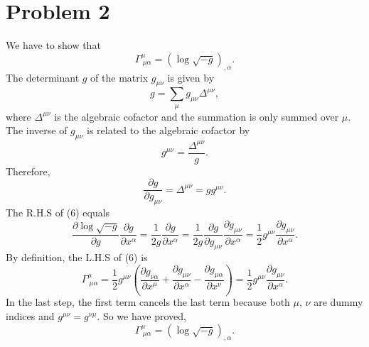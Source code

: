 \documentclass{article}
\begin{document}
\section*{Problem 2}
We have to show that 
\begin{equation} 
    \label{toprove}
    \Gamma^\mu_{~\mu \alpha} = (\log \sqrt{-g})_{,\alpha}.
\end{equation}
The determinant $g$ of the matrix $g_{\mu \nu}$ is given by
\begin{equation}
    g = \sum_\mu g_{\mu \nu} \Delta^{\mu \nu},
\end{equation}
where $\Delta^{\mu\nu}$ is the algebraic cofactor and the summation
is only summed over $\mu$. The inverse of $g_{\mu \nu}$ is related 
to the algebraic cofactor by
\begin{equation}
    g^{\mu \nu} = \frac{\Delta^{\mu \nu}}{g}.
\end{equation}
Therefore,
\begin{equation}
    \frac{\partial g}{\partial g_{\mu \nu}} = \Delta^{\mu \nu} = g g^{\mu \nu}.
\end{equation}
The R.H.S of (6) equals
\begin{equation}
    \frac{\partial \log \sqrt{-g}}{\partial g} \frac{\partial g}{\partial x^\alpha} 
    = \frac{1}{2g} \frac{\partial g}{\partial x^\alpha}
    = \frac{1}{2g} \frac{\partial g}{\partial g_{\mu \nu}}\frac{\partial g_{\mu \nu}}{\partial x^\alpha}
    =\frac{1}{2}g^{\mu \nu} \frac{\partial g_{\mu \nu}}{\partial x^\alpha}.
\end{equation}
By definition, the L.H.S of (6) is 
\begin{equation}
    \Gamma^\mu_{~\mu \alpha} = \frac{1}{2} g^{\mu \nu} 
    \left(
        \frac{\partial g_{\nu \alpha}}{\partial x^\mu} 
        + \frac{\partial g_{\mu \nu}}{\partial x^\alpha}
        -\frac{\partial g_{\mu \alpha}}{\partial x^\nu}
    \right)
    =\frac{1}{2}g^{\mu \nu} \frac{\partial g_{\mu \nu}}{\partial x^\alpha}.
\end{equation}
In the last step, the first term cancels the last term because both $\mu$, $\nu$ are
dummy indices and $g^{\mu \nu} = g^{\nu \mu}$. So we have proved,
\begin{equation}
    \Gamma^\mu_{~\mu \alpha} = \left(\log \sqrt{-g}\right)_{,\alpha}.
\end{equation}
\end{document}
